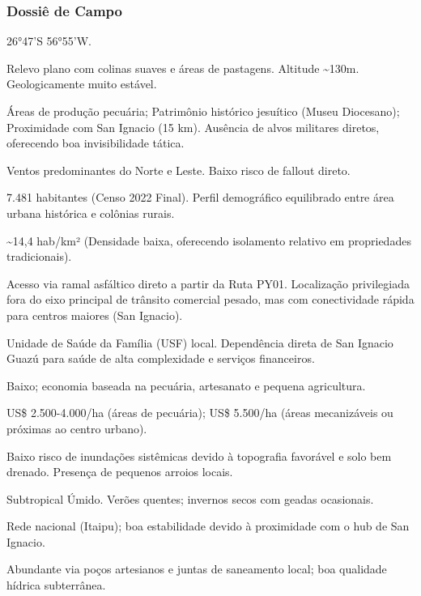\subsubsection{Dossiê de Campo}
\begin{description}[style=nextline,leftmargin=0.5cm,font=\bfseries]
\item[Coordenadas]  26°47'S 56°55'W.
\item[Topografia]  Relevo plano com colinas suaves e áreas de pastagens. Altitude \textasciitilde 130m. Geologicamente muito estável.
\item[Alvos Estratégicos]  Áreas de produção pecuária; Patrimônio histórico jesuítico (Museu Diocesano); Proximidade com San Ignacio (15 km). Ausência de alvos militares diretos, oferecendo boa invisibilidade tática.
\item[Fallout]  Ventos predominantes do Norte e Leste. Baixo risco de fallout direto.
\item[População]  7.481 habitantes (Censo 2022 Final). Perfil demográfico equilibrado entre área urbana histórica e colônias rurais.
\item[Densidade]  \textasciitilde 14,4 hab/\allowbreak km² (Densidade baixa, oferecendo isolamento relativo em propriedades tradicionais).
\item[Vias de Acesso]  Acesso via ramal asfáltico direto a partir da Ruta PY01. Localização privilegiada fora do eixo principal de trânsito comercial pesado, mas com conectividade rápida para centros maiores (San Ignacio).
\item[Serviços]  Unidade de Saúde da Família (USF) local. Dependência direta de San Ignacio Guazú para saúde de alta complexidade e serviços financeiros.
\item[Custo de Vida]  Baixo; economia baseada na pecuária, artesanato e pequena agricultura.
\item[Preço da Terra]  US\$ 2.500-4.000/\allowbreak ha (áreas de pecuária); US\$ 5.500/\allowbreak ha (áreas mecanizáveis ou próximas ao centro urbano).
\item[Hidrologia]  Baixo risco de inundações sistêmicas devido à topografia favorável e solo bem drenado. Presença de pequenos arroios locais.
\item[Clima]  Subtropical Úmido. Verões quentes; invernos secos com geadas ocasionais.
\item[Energia]  Rede nacional (Itaipu); boa estabilidade devido à proximidade com o hub de San Ignacio.
\item[Água]  Abundante via poços artesianos e juntas de saneamento local; boa qualidade hídrica subterrânea.

\end{description}
